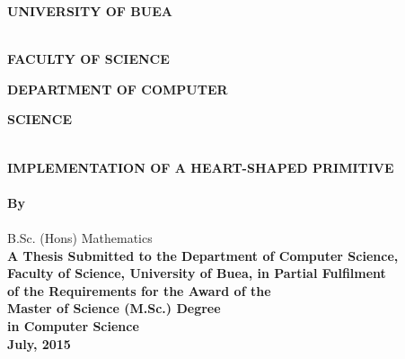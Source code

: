 \documentclass[11pt, oneside]{Thesis} %
\title{\ttitle} %
\begin{document}
\frontmatter %

\begin{titlepage}
\begin{center}
\textsc{\Large \textbf{UNIVERSITY OF BUEA}}\\[25pt]\\[3.0cm] %
\end{center}

\begin{minipage}{0.5\textwidth}
\begin{flushleft}
\large\textbf{FACULTY OF SCIENCE}
\end{flushleft}
\end{minipage}
\begin{minipage}{0.5\textwidth}
\begin{flushright}
\large\textbf{DEPARTMENT OF COMPUTER}\\  
\end{flushright}
\end{minipage}
\large \hspace*{290} \textbf{SCIENCE}
\hspace{200}\\

\begin{center}
\\[1.5cm]
{\large \bfseries IMPLEMENTATION OF A HEART-SHAPED PRIMITIVE}\\[0.4cm] %
\\[2.5cm]

\large \textbf{ By } \\[0.75cm]

\Large \textbf{\authornames} \\ 

\small B.Sc. (Hons) Mathematics \\[2.5cm]

\large \textbf{A Thesis Submitted to the Department of Computer Science, \\
		Faculty of Science, University of Buea, in Partial Fulfilment \\ 
		of the Requirements for the Award of the \\
		Master of Science (M.Sc.) Degree \\
		in Computer Science}\\[2.5cm]

\large \textbf{July, 2015}

\end{center}

\end{titlepage}
\end{document}
